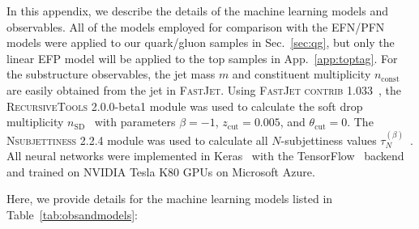 \documentclass[letterpaper,11pt]{article}
\DeclareRobustCommand{\Sec}[1]{Sec.~\ref{#1}}
\DeclareRobustCommand{\App}[1]{App.~\ref{#1}}
\DeclareRobustCommand{\Tab}[1]{Table~\ref{#1}}
\begin{document}
In this appendix, we describe the details of the machine learning models and observables.
%
All of the models employed for comparison with the EFN/PFN models were applied to our quark/gluon samples in \Sec{sec:qg}, but only the linear EFP model will be applied to the top samples in \App{app:toptag}.
%
For the substructure observables, the jet mass $m$ and constituent multiplicity $n_\text{const}$ are easily obtained from the jet in \textsc{FastJet}. 
%
Using \textsc{FastJet contrib} 1.033~\cite{fjcontrib}, the \textsc{RecursiveTools} 2.0.0-beta1 module was used to calculate the soft drop multiplicity $n_\text{SD}$~\cite{Frye:2017yrw} with parameters $\beta=-1$, $z_\text{cut}=0.005$, and $\theta_\text{cut}=0$.
%
The \textsc{Nsubjettiness} 2.2.4 module was used to calculate all $N$-subjettiness values $\tau_N^{(\beta)}$~\cite{Thaler:2010tr,Thaler:2011gf}.
%
All neural networks were implemented in Keras~\cite{keras} with the TensorFlow~\cite{tensorflow} backend and trained on NVIDIA Tesla K80 GPUs on Microsoft Azure.


Here, we provide details for the machine learning models listed in \Tab{tab:obsandmodels}:
\end{document}
